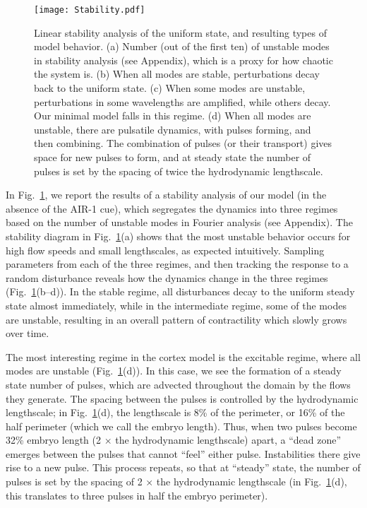 \documentclass[11pt]{article}
\begin{document}
\begin{figure}
\centering
\texttt{[image: Stability.pdf]}
\caption{\label{fig:Stability} Linear stability analysis of the uniform state, and resulting types of model behavior. (a) Number (out of the first ten) of unstable modes in stability analysis (see Appendix), which is a proxy for how chaotic the system is. (b) When all modes are stable, perturbations decay back to the uniform state. (c) When some modes are unstable, perturbations in some wavelengths are amplified, while others decay. Our minimal model falls in this regime. (d) When all modes are unstable, there are pulsatile dynamics, with pulses forming, and then combining. The combination of pulses (or their transport) gives space for new pulses to form, and at steady state the number of pulses is set by the spacing of twice the hydrodynamic lengthscale. }
\end{figure}

In Fig.\ \ref{fig:Stability}, we report the results of a stability analysis of our model (in the absence of the AIR-1 cue), which segregates the dynamics into three regimes based on the number of unstable modes in Fourier analysis (see Appendix). The stability diagram in Fig.\ \ref{fig:Stability}(a) shows that the most unstable behavior occurs for high flow speeds and small lengthscales, as expected intuitively. Sampling parameters from each of the three regimes, and then tracking the response to a random disturbance reveals how the dynamics change in the three regimes (Fig.\ \ref{fig:Stability}(b--d)). In the stable regime, all disturbances decay to the uniform steady state almost immediately, while in the intermediate regime, some of the modes are unstable, resulting in an overall pattern of contractility which slowly grows over time. 

The most interesting regime in the cortex model is the excitable regime, where all modes are unstable (Fig.\ \ref{fig:Stability}(d)). In this case, we see the formation of a steady state number of pulses, which are advected throughout the domain by the flows they generate. The spacing between the pulses is controlled by the hydrodynamic lengthscale; in Fig.\ \ref{fig:Stability}(d), the lengthscale is 8\% of the perimeter, or 16\% of the half perimeter (which we call the embryo length). Thus, when two pulses become 32\% embryo length (2 $\times$ the hydrodynamic lengthscale) apart, a ``dead zone'' emerges between the pulses that cannot ``feel'' either pulse. Instabilities there give rise to a new pulse. This process repeats, so that at ``steady'' state, the number of pulses is set by the spacing of 2 $\times$ the hydrodynamic lengthscale (in Fig.\ \ref{fig:Stability}(d), this translates to three pulses in half the embryo perimeter). 
\end{document}
